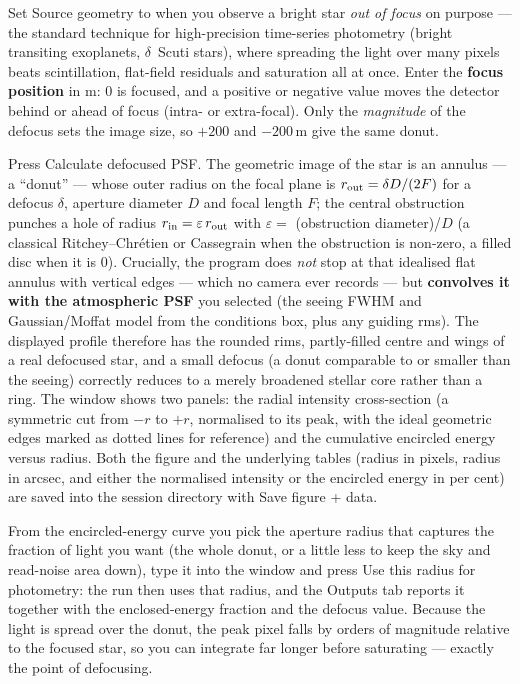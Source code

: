 Set \textsf{Source geometry} to  when you observe a bright
star \emph{out of focus} on purpose --- the standard technique for
high-precision time-series photometry (bright transiting exoplanets,
$\delta$~Scuti stars), where spreading the light over many pixels beats
scintillation, flat-field residuals and saturation all at once. Enter the
\textbf{focus position} in \textmu m: 0 is focused, and a positive or
negative value moves the detector behind or ahead of focus (intra- or
extra-focal). Only the \emph{magnitude} of the defocus sets the image
size, so $+200$ and $-200$\,\textmu m give the same donut.

Press \textsf{Calculate defocused PSF}. The geometric image of the star is
an annulus --- a ``donut'' --- whose outer radius on the focal plane is
$r_{\rm out} = \delta D / (2F)$ for a defocus $\delta$, aperture diameter
$D$ and focal length $F$; the central obstruction punches a hole of radius
$r_{\rm in} = \varepsilon\,r_{\rm out}$ with
$\varepsilon = $ (obstruction diameter)/$D$ (a classical
Ritchey--Chr\'etien or Cassegrain when the obstruction is non-zero, a
filled disc when it is 0). Crucially, the program does \emph{not} stop at
that idealised flat annulus with vertical edges --- which no camera ever
records --- but \textbf{convolves it with the atmospheric PSF} you
selected (the seeing FWHM and Gaussian/Moffat model from the conditions
box, plus any guiding rms). The displayed profile therefore has the
rounded rims, partly-filled centre and wings of a real defocused star, and
a small defocus (a donut comparable to or smaller than the seeing)
correctly reduces to a merely broadened stellar core rather than a ring.
The window shows two panels: the radial intensity cross-section (a
symmetric cut from $-r$ to $+r$, normalised to its peak, with the ideal
geometric edges marked as dotted lines for reference) and the cumulative
encircled energy versus radius. Both the figure and the underlying tables
(radius in pixels, radius in arcsec, and either the normalised intensity
or the encircled energy in per cent) are saved into the session directory
with \textsf{Save figure + data}.

From the encircled-energy curve you pick the aperture radius that captures
the fraction of light you want (the whole donut, or a little less to keep
the sky and read-noise area down), type it into the window and press
\textsf{Use this radius for photometry}: the run then uses that radius,
and the Outputs tab reports it together with the enclosed-energy fraction
and the defocus value. Because the light is spread over the donut, the
peak pixel falls by orders of magnitude relative to the focused star, so
you can integrate far longer before saturating --- exactly the point of
defocusing.

